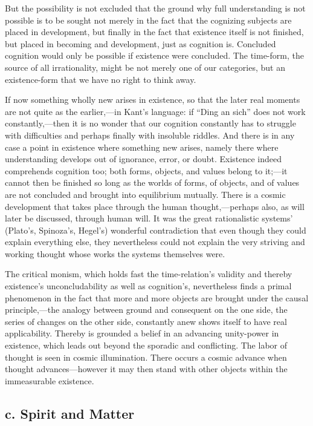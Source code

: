 \documentclass[12pt,a4paper]{book}
\newcommand{\opage}[1]{\marginnote{\footnotesize\textit{[#1]}}}
\begin{document}
But the possibility is not excluded that the ground why full understanding is not possible is to be
sought not merely in the fact that the cognizing subjects are placed in development, but finally in the
fact that existence itself is not finished, but placed in \opage{328}becoming and development, just as cognition is.
Concluded cognition would only be possible if existence were concluded. The time-form, the source of all
irrationality, might be not merely one of our categories, but an existence-form that we have no right to
think away.

If now something wholly new arises in existence, so that the later real moments are not quite as the
earlier,---in Kant's language: if ``Ding an sich'' does not work constantly,---then it is no wonder that
our cognition constantly has to struggle with difficulties and perhaps finally with insoluble riddles.
And there is in any case a point in existence where something new arises, namely there where
understanding develops out of ignorance, error, or doubt. Existence indeed comprehends cognition too;
both forms, objects, and values belong to it;---it cannot then be finished so long as the worlds of forms,
of objects, and of values are not concluded and brought into equilibrium mutually. There is a cosmic
development that takes place through the human thought,---perhaps also, as will later be discussed, through
human will. It was the great rationalistic systems' (Plato's, Spinoza's, Hegel's) wonderful contradiction
that even though they could explain everything else, they nevertheless could not explain the very striving
and working thought whose works the systems themselves were.

The critical monism, which holds fast the time-relation's validity and thereby existence's
unconcludability as well as cognition's, nevertheless finds a primal phenomenon in the fact that more and
more objects are brought under the causal principle,---the analogy between ground and consequent on the
one side, the series of changes on the other side, constantly anew shows itself to have real
applicability. Thereby is grounded a belief in an advancing unity-power in existence, which leads out
beyond the sporadic and conflicting. The labor of thought is seen in cosmic illumination. There occurs a
cosmic advance when thought advances---however it may then stand with other objects within the immeasurable
existence.

\subsection*{c. Spirit and Matter}
\end{document}
